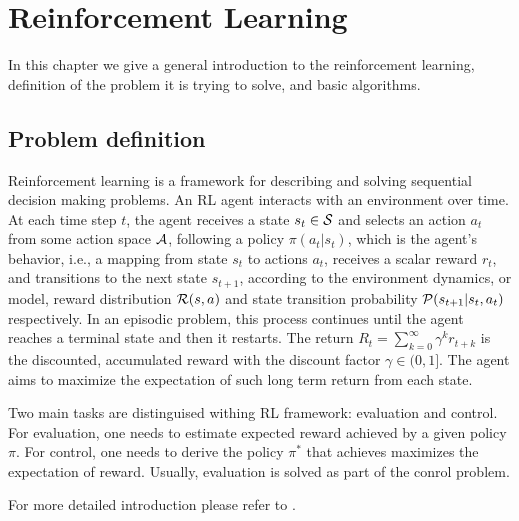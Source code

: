 
\section{Reinforcement Learning}

In this chapter we give a general introduction to the reinforcement learning, definition of the
problem it is trying to solve, and basic algorithms.


\subsection{Problem definition}


Reinforcement learning is a framework for describing and solving sequential decision making problems.
An RL agent interacts with an environment over time. At each time step $t$, the agent receives a state $s_t \in \mathcal{S}$
and selects an action $a_t$ from some action space $\mathcal{A}$, following a policy $\pi(a_t|s_t)$, which is the
agent's behavior, i.e., a mapping from state $s_t$ to actions $a_t$, receives a scalar reward
$r_t$, and transitions to the next state $s_{t+1}$, according to the environment dynamics, or
model, reward distribution $\mathcal{R}(s,a)$ and state transition probability $\mathcal{P}(s_{t+1}|s_t, a_t)$ respectively.
In an episodic problem, this process continues until the agent reaches a terminal state and then it restarts.
The return $R_t = \sum_{k=0}^{\infty} \gamma^k r_{t+k}$ is the discounted, accumulated reward
with the discount factor $\gamma \in (0,1]$. The agent aims to maximize the expectation of such long term return from each state.


Two main tasks are distinguised withing RL framework: evaluation and control. For evaluation,
one needs to estimate expected reward achieved by a given policy $\pi$. For control, one needs to
derive the policy $\pi^*$ that achieves maximizes the expectation of reward. Usually, evaluation is
solved as part of the conrol problem.

For more detailed introduction please refer to \cite{sutton1998reinforcement}.

